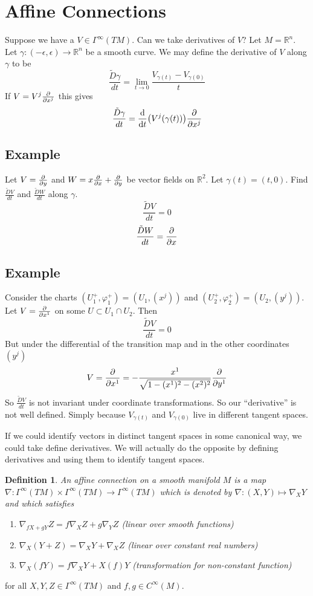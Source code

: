 \documentclass[a4paper]{article}
\newtheorem*{defn}{Definition}
\begin{document}
\section*{Affine Connections}%
Suppose we have a $V \in \Gamma^{\infty}(TM)$. Can we take derivatives of $V$? Let $M=\mathds{R}^n$. Let $\gamma:(-\epsilon, \epsilon) \rightarrow \mathds{R}^n$ be a smooth curve. We may define the derivative of $V$ along $\gamma$ to be 
\[
  \frac{\tilde{D}\gamma}{dt} = \lim_{t \rightarrow 0} \frac{V_{\gamma(t)} - V_{\gamma(0)}}{t}
\]
If $V = V^j \pdv{x^j}$ this gives
\[
  \frac{\tilde{D}\gamma}{dt} =  \dv{t} (V^j(\gamma(t))) \pdv{x^j}
\]

\subsection*{Example}%
Let $V = \pdv{y}$ and $W = x\pdv{x} + \pdv{y}$ be vector fields on $\mathds{R}^2$. Let $\gamma(t) = (t,0)$. Find $\frac{\tilde{D}V}{dt}$ and $\frac{\tilde{D}W}{dt}$ along $\gamma$.
\[
  \frac{\tilde{D}V}{dt} = 0
\]
\[
  \frac{\tilde{D}W}{dt} = \pdv{x}
\]

\subsection*{Example}%
Consider the charts $(U_1^+, \varphi_1^+) = (U_1, (x^j))$ and $(U_2^+, \varphi_2^+) = (U_2, (y^j))$. Let $V = \pdv{x^1}$ on some $U \subset U_1 \cap U_2$. Then 
\[
  \frac{\tilde{D}V}{dt} = 0
\]
But under the differential of the transition map and in the other coordinates $(y^j)$
\[
  V = \pdv{x^1} = -\frac{x^1}{\sqrt{1 - (x^1)^2 - (x^2)^2}} \pdv{y^1}
\]
So $\frac{\tilde{D}V}{dt}$ is not invariant under coordinate transformations. So our ``derivative'' is not well defined. Simply because $V_{\gamma(t)}$ and $V_{\gamma(0)}$ live in different tangent spaces.

If we could identify vectors in distinct tangent spaces in some canonical way, we could take define derivatives. We will actually do the opposite by defining derivatives and using them to identify tangent spaces.

\begin{defn}
  An affine connection on a smooth manifold $M$ is a map $\nabla: \Gamma^{\infty}(TM) \times \Gamma^{\infty}(TM) \rightarrow \Gamma^{\infty}(TM)$ which is denoted by $\nabla: (X,Y) \mapsto \nabla_X Y$ and which satisfies 
  \begin{enumerate}
    \item $\nabla_{fX+gY}Z = f\nabla_X Z + g \nabla_Y Z$ (linear over smooth functions)
    \item $\nabla_X(Y+Z) = \nabla_X Y + \nabla_X Z$ (linear over constant real numbers)
    \item $\nabla_X(fY) =  f\nabla_X Y + X(f)Y$ (transformation for non-constant function)
  \end{enumerate}
\end{defn}
 for all $X,Y,Z \in \Gamma^{\infty}(TM)$ and $f,g \in C^{\infty}(M)$. 
\end{document}
